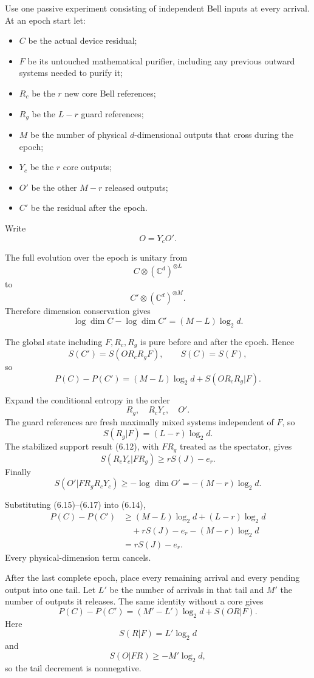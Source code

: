 \documentclass[11pt,a4paper]{article}
\providecommand{\tightlist}{\setlength{\itemsep}{0pt}\setlength{\parskip}{0pt}}
\numberwithin{equation}{section}
\begin{document}
Use one passive experiment consisting of independent Bell inputs at
every arrival. At an epoch start let:

\begin{itemize}
\tightlist
\item
  \(C\) be the actual device residual;
\item
  \(F\) be its untouched mathematical purifier, including any previous
  outward systems needed to purify it;
\item
  \(R_c\) be the \(r\) new core Bell references;
\item
  \(R_g\) be the \(L-r\) guard references;
\item
  \(M\) be the number of physical \(d\)-dimensional outputs that cross
  during the epoch;
\item
  \(Y_c\) be the \(r\) core outputs;
\item
  \(O'\) be the other \(M-r\) released outputs;
\item
  \(C'\) be the residual after the epoch.
\end{itemize}

Write \[
O=Y_cO'.
\]

The full evolution over the epoch is unitary from \[
C\otimes(\mathbb C^d)^{\otimes L}
\] to \[
C'\otimes(\mathbb C^d)^{\otimes M}.
\] Therefore dimension conservation gives \[
\log\dim C-\log\dim C'
=
(M-L)\log_2d.
\tag{6.13}
\]

The global state including \(F,R_c,R_g\) is pure before and after the
epoch. Hence \[
S(C')=S(OR_cR_gF),
\qquad
S(C)=S(F),
\] so \[
P(C)-P(C')
=
(M-L)\log_2d
+
S(OR_cR_g|F).
\tag{6.14}
\]

Expand the conditional entropy in the order \[
R_g,\quad R_cY_c,\quad O'.
\] The guard references are fresh maximally mixed systems independent of
\(F\), so \[
S(R_g|F)=(L-r)\log_2d.
\tag{6.15}
\] The stabilized support result (6.12), with \(FR_g\) treated as the
spectator, gives \[
S(R_cY_c|FR_g)
\ge
rS(J)-e_r.
\tag{6.16}
\] Finally \[
S(O'|FR_gR_cY_c)
\ge
-\log\dim O'
=
-(M-r)\log_2d.
\tag{6.17}
\]

Substituting (6.15)--(6.17) into (6.14), \[
\begin{aligned}
P(C)-P(C')
&\ge
(M-L)\log_2d
+(L-r)\log_2d\\
&\quad+rS(J)-e_r
-(M-r)\log_2d\\
&=
rS(J)-e_r.
\end{aligned}
\tag{6.18}
\] Every physical-dimension term cancels.

After the last complete epoch, place every remaining arrival and every
pending output into one tail. Let \(L'\) be the number of arrivals in
that tail and \(M'\) the number of outputs it releases. The same
identity without a core gives \[
P(C)-P(C')
=
(M'-L')\log_2d+S(OR|F).
\] Here \[
S(R|F)=L'\log_2d
\] and \[
S(O|FR)\ge-M'\log_2d,
\] so the tail decrement is nonnegative.
\end{document}
